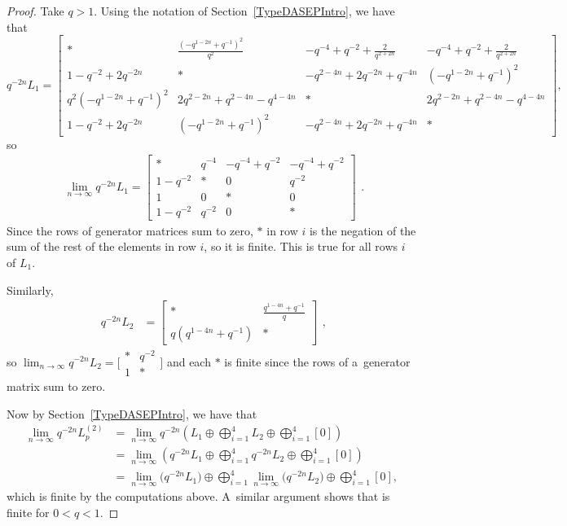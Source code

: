 \documentclass[pdftex]{sigma}
\numberwithin{equation}{section}
\theoremstyle{definition}
\begin{document}
\begin{proof}
\label{finite_proof}
Take $q >1$. Using the notation of Section~\ref{TypeDASEPIntro}, we have that
\[
q^{-2n} L_1 =\left[\begin{smallmatrix} * & \frac{(- q^{1 - 2n} + q^{- 1})^{2}}{q^{2}} & - q^{- 4} + q^{ - 2} + \frac{2}{q^{2+2n}} & - q^{- 4} + q^{ - 2} + \frac{2}{q^{2+2n}}
\\1 - q^{ - 2} + 2q^{-2n} & * & - q^{2 - 4 n} + 2q^{-2n} + q^{- 4 n} & \left(- q^{1 - 2n} + q^{- 1}\right)^{2}
\\ q^{2} \left(- q^{1 - 2n} + q^{- 1}\right)^{2} & 2 q^{2-2n} + q^{2 - 4 n} - q^{4 - 4 n} & * & 2 q^{2-2n} + q^{2 - 4 n} - q^{4 - 4 n}
\\ 1 - q^{- 2} + 2q^{-2n} & \left(- q^{1 - 2n} + q^{- 1}\right)^{2} & - q^{2 - 4 n} + 2q^{-2n} + q^{- 4 n} & *
\end{smallmatrix}\right],
\]
so
\[\begin{aligned}
 \lim_{n \to \infty} q^{-2n} L_1= \begin{bmatrix} * & q^{-4} & - q^{- 4} + q^{ - 2} & - q^{- 4} + q^{ - 2}
\\1 - q^{ - 2} & * & 0 & q^{-2}
\\ 1 & 0 & * & 0
\\ 1 - q^{- 2} & q^{-2} & 0 & *
\end{bmatrix}
\end{aligned}.\]
Since the rows of generator matrices sum to zero, $*$ in row $i$ is the negation of the sum of the rest of the elements in row $i$, so it is finite. This is true for all rows $i$ of $L_1$.

Similarly,
\[\begin{aligned}
 q^{-2n}L_2
 &=\begin{bmatrix} * & \frac{q^{1 - 4 n} + q^{- 1}}{q}\\q \left(q^{1 - 4n} + q^{- 1}\right) & * \end{bmatrix}
\end{aligned}, \]
so $
 \lim_{n \to \infty} q^{-2n} L_2 =\big[
\begin{smallmatrix} * & q^{-2} \\1 & * \end{smallmatrix}\big]$
and each $*$ is finite since the rows of a~generator matrix sum to zero.

Now by Section~\ref{TypeDASEPIntro}, we have that
\begin{align*}
 \lim_{n \to \infty} q^{-2n} L_p^{(2)} &=\lim_{n \to \infty} q^{-2n} \left(L_1 \oplus \bigoplus_{i=1}^4 L_2 \oplus \bigoplus_{i=1}^4 [0]\right) \\
 &=
\lim_{n \to \infty} \left(q^{-2n} L_1 \oplus \bigoplus_{i=1}^4 q^{-2n}L_2 \oplus \bigoplus_{i=1}^4 [0]\right) \\
&= \lim_{n \to \infty} \bigl(q^{-2n} L_1\bigr) \oplus \bigoplus_{i=1}^4 \lim_{n \to \infty} \bigl(q^{-2n}L_2\bigr) \oplus \bigoplus_{i=1}^4 [0],
\end{align*}
which is finite by the computations above. A~similar argument shows that  is finite for $0 < q< 1$.


\end{proof}
\end{document}
